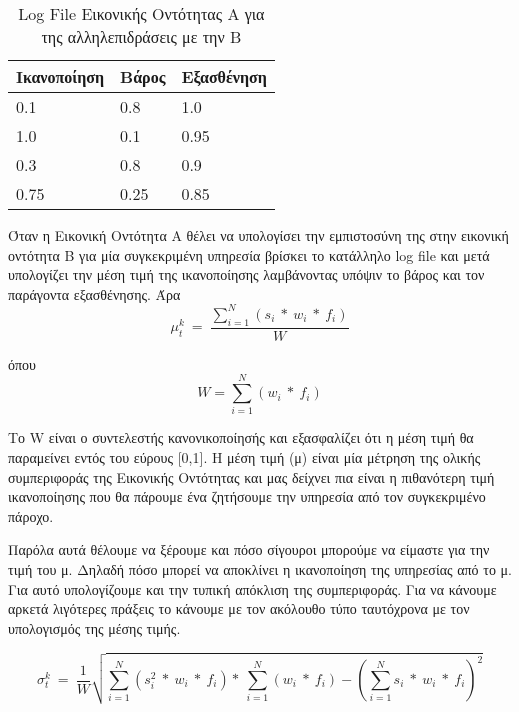 \begin{table}[H]
    \centering
    \begin{tabular}{ | l | l | l | }
        \hline
        Ικανοποίηση & Βάρος & Εξασθένηση \\ \hline \hline
        0.1 & 0.8 & 1.0  \\ \hline
        1.0 & 0.1 & 0.95  \\ \hline
        0.3 & 0.8 & 0.9  \\ \hline
        0.75 & 0.25 & 0.85  \\ \hline
    \end{tabular}
    \caption{Log File Εικονικής Οντότητας Α για της αλληλεπιδράσεις με την Β}
    \label{tab:log file}
\end{table}

\newpage
Όταν η Εικονική Οντότητα Α θέλει να υπολογίσει την εμπιστοσύνη της στην εικονική οντότητα Β για μία συγκεκριμένη υπηρεσία βρίσκει το κατάλληλο log file και μετά υπολογίζει την μέση τιμή της ικανοποίησης λαμβάνοντας υπόψιν το βάρος και τον παράγοντα εξασθένησης. Άρα 
\begin{equation}\label{eq:average}
 \mu_t^k\  =\ \frac{\sum_{i=1}^{N}\left(s_i\ *\ w_i\ *\ f_i\right)}{W} 
\end{equation}

όπου 
\begin{equation}\label{eq:weight}
 W = \sum_{i=1}^{N}\left(w_i\ *\ f_i\right)
\end{equation}

Το W είναι ο συντελεστής κανονικοποίησής και εξασφαλίζει ότι η μέση τιμή θα παραμείνει εντός του εύρους [0,1]. Η μέση τιμή (μ) είναι μία μέτρηση της ολικής συμπεριφοράς της Εικονικής Οντότητας και μας δείχνει πια είναι η πιθανότερη τιμή ικανοποίησης που θα πάρουμε ένα ζητήσουμε την υπηρεσία από τον συγκεκριμένο πάροχο.

Παρόλα αυτά θέλουμε να ξέρουμε και πόσο σίγουροι μπορούμε να είμαστε για την τιμή του μ. Δηλαδή πόσο μπορεί να αποκλίνει η ικανοποίηση της υπηρεσίας από το μ. Για αυτό υπολογίζουμε και την τυπική απόκλιση της συμπεριφοράς. Για να κάνουμε αρκετά λιγότερες πράξεις το κάνουμε με τον ακόλουθο τύπο ταυτόχρονα με τον υπολογισμός της μέσης τιμής.

\begin{equation}\label{eq:deviation}
 \sigma_t^k\  =\ \frac{1}{W} \sqrt{\sum_{i=1}^{N}\left(s_i^2\ *\ w_i\ *\ f_i\right)* \ \sum_{i=1}^{N} \left(w_i\ * \ f_i \right)- \left( \sum_{i=1}^{N} s_i\ *\ w_i\ *\ f_i\right)^2}
\end{equation}

